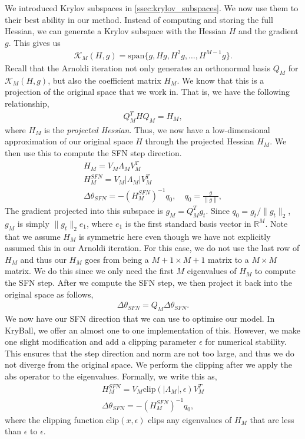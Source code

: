 We introduced Krylov subspaces in \cref{ssec:krylov_subspaces}. We now use them to their best ability in our method. Instead of computing and storing the full Hessian, we can generate a Krylov subspace with the Hessian $H$ and the gradient $g$. This gives us
\begin{align}
    \mathcal{K}_{M}(H, g) = \text{span} \{g, H g, H^2 g, \ldots, H^{M-1} g \}.
\end{align}
 Recall that the Arnoldi iteration not only generates an orthonormal basis $Q_M$ for $\mathcal{K}_{M}(H, g)$, but also the coefficient matrix $H_M$. We know that this is a projection of the original space that we work in. That is, we have the following relationship,
\begin{align}
    Q_M^T H Q_M = H_M,
\end{align}
where $H_M$ is the \textit{projected Hessian}. Thus, we now have a low-dimensional approximation of our original space $H$ through the projected Hessian $H_M$. We then use this to compute the SFN step direction.
\begin{align}
    H_M = V_M \Lambda_M V_M^T \\
    H_M^{SFN} = V_M |\Lambda_M| V_M^T \\
    \Delta \theta_{SFN} = -(H_M^{SFN})^{-1} q_0, \quad q_0 = \frac{g}{\| g \|},
\end{align}
The gradient projected into this subspace is $g_M = Q_M^T g_t$. Since $q_0 = g_t/\|g_t\|_2$, $g_M$ is simply $\|g_t\|_2 e_1$, where $e_1$ is the first standard basis vector in $\mathbb{R}^M$. Note that we assume $H_M$ is symmetric here even though we have not explicitly assumed this in our Arnoldi iteration. For this case, we do not use the last row of $H_M$ and thus our $H_M$ goes from being a $M+1 \times M+1$ matrix to a $M \times M$ matrix. We do this since we only need the first $M$ eigenvalues of $H_M$ to compute the SFN step. After we compute the SFN step, we then project it back into the original space as follows,
\begin{align}
    \Delta \theta_{SFN} = Q_M \Delta \theta_{SFN}.
\end{align}
We now have our SFN direction that we can use to optimise our model. In KryBall, we offer an almost one to one implementation of this. However, we make one slight modification and add a clipping parameter $\epsilon$ for numerical stability. This ensures that the step direction and norm are not too large, and thus we do not diverge from the original space. We perform the clipping after we apply the abs operator to the eigenvalues. Formally, we write this as,
\begin{align}
    H_M^{SFN} = V_M \text{clip}(|\Lambda_M|, \epsilon) V_M^T \\
    \Delta \theta_{SFN} = -(H_M^{SFN})^{-1} q_0,
\end{align}
where the clipping function $\text{clip}(x, \epsilon)$ clips any eigenvalues of $H_M$ that are less than $\epsilon$ to $\epsilon$.

